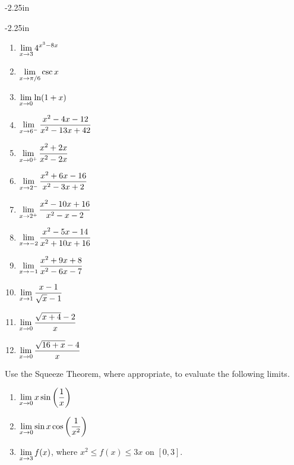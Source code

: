 \begin{adjustwidth*}{}{-2.25in}
\begin{multicols*}{2}
\end{multicols*}
\end{adjustwidth*}

\clearpage

\begin{adjustwidth*}{}{-2.25in}
\setlength{\columnsep}{25pt}
\begin{multicols*}{2}\small

\begin{multicols}{2}
\begin{enumerate}[1),start=29]
\item {$\displaystyle \lim_{x\to3}4^{x^3-8x}$}
\item {$\displaystyle \lim_{x\to\pi/6} \csc x$}
\item {$\displaystyle \lim_{x\to0} \ln(1+x)$}
\item {$\displaystyle \lim_{x\to6^-} \frac{x^2-4 x-12}{x^2-13 x+42}$}
\item {$\displaystyle \lim_{x\to0^+} \frac{x^2+2 x}{x^2-2 x}$}
\item {$\displaystyle \lim_{x\to2^-} \frac{x^2+6 x-16}{x^2-3 x+2}$}
\item {$\displaystyle \lim_{x\to2^+}\frac{x^2-10 x+16}{x^2-x-2}$}
\item {$\displaystyle \lim_{x\to-2}\frac{x^2-5 x-14}{x^2+10 x+16}$}
\item {$\displaystyle \lim_{x\to-1}\frac{x^2+9 x+8}{x^2-6 x-7}$}
\item $\displaystyle \lim_{x \to 1} \frac{x-1}{\sqrt{x} - 1}$
\item $\displaystyle \lim_{x \to 0} \frac{\sqrt{x+4} - 2}{x}$
\item $\displaystyle \lim_{x \to 0} \frac{\sqrt{16 + x} - 4}{x}$
\end{enumerate}
\end{multicols}

\vspace{.5cm}

\noindent Use the Squeeze Theorem, where appropriate, to evaluate the following limits.
\begin{enumerate}[1),start=41]
\item {$\displaystyle \lim_{x \to 0} x \sin\left( \frac{1}{x} \right)$}
\item {$\displaystyle \lim_{x\to0} \sin x\cos\left(\frac{1}{x^2}\right)$}
\item {$\displaystyle \lim_{x\to3} f(x)$, where $x^2\leq f(x) \leq 3x$ on $[0,3]$.}
\end{enumerate}

\vspace{.5cm}


\end{multicols*}
\end{adjustwidth*}
